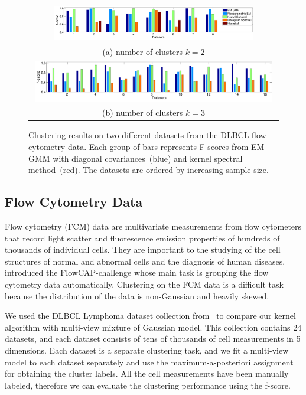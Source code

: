 \documentclass{article}
\begin{document}
\begin{figure}[t!]
  \centering
	\begin{tabular}{c}
		\includegraphics[width=0.82\textwidth]{../experiment/figure_new/paired_bar_chat_k_2} \\
		(a) number of clusters $k=2$ \\
		\includegraphics[width=0.98\textwidth]{../experiment/figure_new/paired_bar_chat_k_3}  \\
		(b) number of clusters $k=3$
	\end{tabular}
  \vspace{-3mm}
  \caption{Clustering results on two different datasets from the DLBCL flow cytometry data. Each group of bars represents F-scores from EM-GMM with diagonal covariances~(blue) and kernel spectral method~(red). The datasets are ordered by increasing sample size.}\label{fig:real_data}
  \vspace{-3mm}
\end{figure}

\vspace{-3mm}
\subsection{Flow Cytometry Data}
\vspace{-3mm}
% 

Flow cytometry (FCM) data are multivariate measurements from flow cytometers that record light scatter and fluorescence emission properties of hundreds of thousands of individual cells. They are important to the studying of the cell structures of normal and abnormal cells and the diagnosis of human diseases. \citet{AghFinEtal13} introduced the FlowCAP-challenge whose main task is grouping the flow cytometry data automatically. Clustering on the FCM data is a difficult task because the distribution of the data is non-Gaussian and heavily skewed.

We used the DLBCL Lymphoma dataset collection from~\cite{AghFinEtal13} to compare our kernel algorithm with multi-view mixture of Gaussian model.
This collection contains 24 datasets, and each dataset consists of tens of thousands of cell measurements in 5 dimensions. Each dataset is a separate clustering task, and we fit a multi-view model to each dataset separately and use the maximum-a-posteriori assignment for obtaining the cluster labels.  All the cell measurements have been manually labeled, therefore we can evaluate the clustering performance using the f-score.
\end{document}
